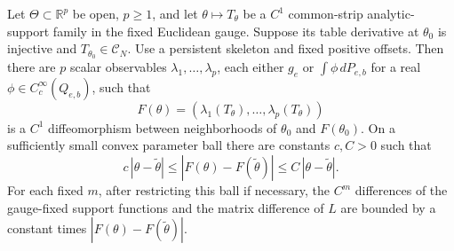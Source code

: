 \begin{theorem}
\label{thm:v48-finite-coordinates}
Let $\Theta\subset\mathbb R^p$ be open, $p\ge1$, and let
$\theta\mapsto T_\theta$ be a $C^1$ common-strip analytic-support family
in the fixed Euclidean gauge.  Suppose its table derivative at
$\theta_0$ is injective and $T_{\theta_0}\in\mathscr C_N$.
Use a persistent skeleton and fixed positive offsets.  Then there are
$p$ scalar observables $\lambda_1,\ldots,\lambda_p$, each either
$g_e$ or $\int\phi\,dP_{e,b}$ for a real
$\phi\in C_c^\infty(Q_{e,b})$, such that
\begin{equation}\label{eq:v48-finite-coordinate-map}
 F(\theta)=(\lambda_1(T_\theta),\ldots,\lambda_p(T_\theta))
\end{equation}
is a $C^1$ diffeomorphism between neighborhoods of $\theta_0$ and
$F(\theta_0)$.  On a sufficiently small convex parameter ball there
are constants $c,C>0$ such that
\begin{equation}\label{eq:v48-local-bilip}
 c\,|\theta-\widetilde\theta|
       \le |F(\theta)-F(\widetilde\theta)|
       \le C\,|\theta-\widetilde\theta|.
\end{equation}
For each fixed $m$, after restricting this ball if necessary, the
$C^m$ differences of the gauge-fixed support functions and the
matrix difference of $L$ are bounded by a constant times
$|F(\theta)-F(\widetilde\theta)|$.
\end{theorem}

